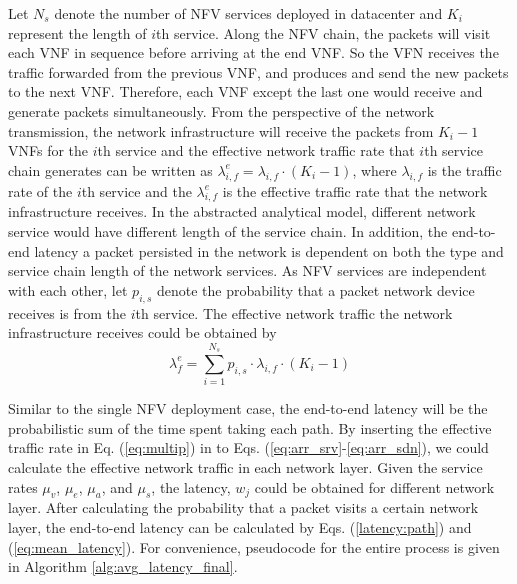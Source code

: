 Let $N_s$ denote the number of NFV services deployed in datacenter and $K_i$ represent the length of $i$th service. Along the NFV chain, the packets will visit each VNF in sequence before arriving at the end VNF. So the VFN receives the traffic forwarded from the previous VNF, and produces and send the new packets to the next VNF. Therefore, each VNF except the last one would receive and generate packets simultaneously. From the perspective of the network transmission, the network infrastructure will receive the packets from $K_i-1$ VNFs for the $i$th service and the effective network traffic rate that $i$th service chain generates can be written as $\lambda_{i,f}^{e} = \lambda_{i,f} \cdot (K_i - 1)$, where $\lambda_{i,f}$ is the traffic rate of the $i$th service and the $\lambda_{i,f}^e$ is the effective traffic rate that the network infrastructure receives. In the abstracted analytical model, different network service would have different length of the service chain. In addition, the end-to-end latency a packet persisted in the network is dependent on both the type and service chain length of the network services. As NFV services are independent with each other, let $p_{i,s}$ denote the probability that a packet network device receives is from the $i$th service.
The effective network traffic the network infrastructure receives could be obtained by 
\begin{equation}
\label{eq:multip}
\lambda _{ f }^{ e }=\sum _{ i=1 }^{ { N }_{ s } }{p_{i,s} \cdot \lambda _{ i,f }\cdot (K_{ i }-1) }
\end{equation}

Similar to the single NFV deployment case, the end-to-end latency will be the probabilistic sum of the time spent taking each path. By inserting the effective traffic rate in Eq. (\ref{eq:multip}) in to Eqs. (\ref{eq:arr_srv}-\ref{eq:arr_sdn}), we could calculate the effective network traffic in each network layer. Given the service rates $\mu_v$, $\mu_e$, $\mu_a$, and $\mu_s$, the latency, $w_j$ could be obtained for different network layer. After calculating the probability that a packet visits a certain network layer, the end-to-end latency can be calculated by Eqs. (\ref{latency:path}) and (\ref{eq:mean_latency}). 
For convenience, pseudocode for the entire process is given in Algorithm \ref{alg:avg_latency_final}.

